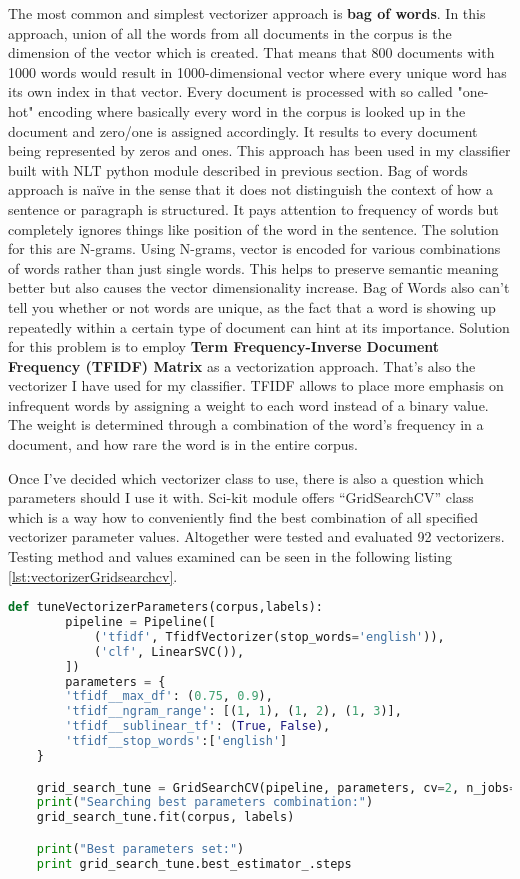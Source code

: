 The most common and simplest vectorizer approach is \textbf{bag of words}.	In this approach, union of all the words from all documents in the corpus is the dimension of the vector which is created. That means that 800 documents with 1000 words would result in 1000-dimensional vector where every unique word has its own index in that vector. Every document is processed with so called "one-hot" encoding where basically every word in the corpus is looked up in the document and zero/one is assigned accordingly. It results to every document being represented by zeros and ones. This approach has been used in my classifier built with NLT python module described in previous section. Bag of words approach is naïve in the sense that it does not distinguish the context of how a sentence or paragraph is structured. It pays attention to frequency of words but completely ignores things like position of the word in the sentence. The solution for this are N-grams. Using N-grams, vector is encoded for various combinations of words rather than just single words. This helps to preserve semantic meaning better but also causes the vector dimensionality increase. Bag of Words also can’t tell you whether or not words are unique, as the fact that a word is showing up repeatedly within a certain type of document can hint at its importance. Solution for this problem is to employ \textbf{Term Frequency-Inverse Document Frequency (TFIDF) Matrix} as a vectorization approach. That's also the vectorizer I have used for my classifier. TFIDF allows to place more emphasis on infrequent words by assigning a weight to each word instead of a binary value. The weight is determined through a combination of the word’s frequency in a document, and how rare the word is in the entire corpus.

Once I've decided which vectorizer class to use, there is also a question which parameters should I use it with. Sci-kit module offers “GridSearchCV” class which is a way how to conveniently find the best combination of all specified vectorizer parameter values. Altogether were tested and evaluated 92 vectorizers. Testing method and values examined can be seen in the following listing \ref{lst:vectorizerGridsearchcv}. 

\begin{lstlisting}[caption={Tuning of vectorizer using “GridSearchCV” class },label={lst:vectorizerGridsearchcv},language=Python]
    def tuneVectorizerParameters(corpus,labels):
    	pipeline = Pipeline([
        	('tfidf', TfidfVectorizer(stop_words='english')),
        	('clf', LinearSVC()),
    	])
    	parameters = {
        'tfidf__max_df': (0.75, 0.9),
        'tfidf__ngram_range': [(1, 1), (1, 2), (1, 3)],
        'tfidf__sublinear_tf': (True, False),
        'tfidf__stop_words':['english']
    }

    grid_search_tune = GridSearchCV(pipeline, parameters, cv=2, n_jobs=2, verbose=3)
    print("Searching best parameters combination:")
    grid_search_tune.fit(corpus, labels)

    print("Best parameters set:")
    print grid_search_tune.best_estimator_.steps
\end{lstlisting}

